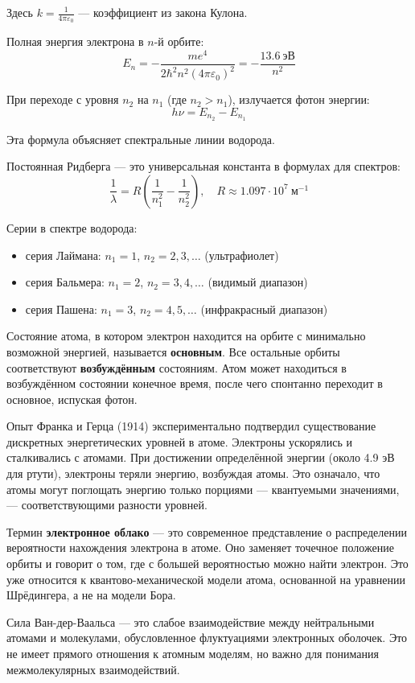 \documentclass[12pt]{article}
\begin{document}
Здесь $k = \frac{1}{4\pi\varepsilon_0}$ — коэффициент из закона Кулона.

Полная энергия электрона в $n$-й орбите:
\[
E_n = - \frac{m e^4}{2 \hbar^2 n^2 (4 \pi \varepsilon_0)^2} = -\frac{13.6\ \text{эВ}}{n^2}
\]

При переходе с уровня $n_2$ на $n_1$ (где $n_2 > n_1$), излучается фотон энергии:
\[
h \nu = E_{n_2} - E_{n_1}
\]

Эта формула объясняет спектральные линии водорода.

Постоянная Ридберга — это универсальная константа в формулах для спектров:
\[
\frac{1}{\lambda} = R \left( \frac{1}{n_1^2} - \frac{1}{n_2^2} \right), \quad R \approx 1.097 \cdot 10^7\ \text{м}^{-1}
\]

Серии в спектре водорода:

\begin{itemize}
    \item серия Лаймана: $n_1 = 1$, $n_2 = 2, 3, \ldots$ (ультрафиолет)  
    \item серия Бальмера: $n_1 = 2$, $n_2 = 3, 4, \ldots$ (видимый диапазон)  
    \item серия Пашена: $n_1 = 3$, $n_2 = 4, 5, \ldots$ (инфракрасный диапазон)
\end{itemize}

Состояние атома, в котором электрон находится на орбите с минимально возможной энергией, называется \textbf{основным}. Все остальные орбиты соответствуют \textbf{возбуждённым} состояниям. Атом может находиться в возбуждённом состоянии конечное время, после чего спонтанно переходит в основное, испуская фотон.

Опыт Франка и Герца (1914) экспериментально подтвердил существование дискретных энергетических уровней в атоме. Электроны ускорялись и сталкивались с атомами. При достижении определённой энергии (около 4.9 эВ для ртути), электроны теряли энергию, возбуждая атомы. Это означало, что атомы могут поглощать энергию только порциями — квантуемыми значениями, — соответствующими разности уровней.

Термин \textbf{электронное облако} — это современное представление о распределении вероятности нахождения электрона в атоме. Оно заменяет точечное положение орбиты и говорит о том, где с большей вероятностью можно найти электрон. Это уже относится к квантово-механической модели атома, основанной на уравнении Шрёдингера, а не на модели Бора.

Сила Ван-дер-Ваальса — это слабое взаимодействие между нейтральными атомами и молекулами, обусловленное флуктуациями электронных оболочек. Это не имеет прямого отношения к атомным моделям, но важно для понимания межмолекулярных взаимодействий.
\end{document}

